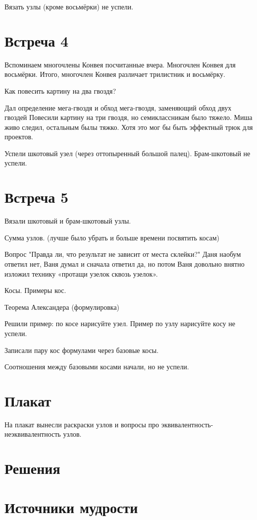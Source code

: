 \documentclass[12pt]{article}
\newcounter{problem}[section]
\theoremstyle{definition}
\begin{document}
Вязать узлы (кроме восьмёрки) не успели.

\section{Встреча 4}

Вспоминаем многочлены Конвея посчитанные вчера.
Многочлен Конвея для восьмёрки. Итого, многочлен Конвея различает
трилистник и восьмёрку.

Как повесить картину на два гвоздя?

Дал определение мега-гвоздя и обход мега-гвоздя, заменяющий обход двух гвоздей
Повесили картину на три гвоздя, но семиклассникам было тяжело. Миша живо следил,
остальным былы тяжко.
Хотя это мог бы быть эффектный трюк для проектов.

Успели шкотовый узел (через оттопыренный большой палец).
Брам-шкотовый не успели.

\section{Встреча 5}

Вязали шкотовый и брам-шкотовый узлы.

Сумма узлов. (лучше было убрать и больше времени посвятить косам)

Вопрос "Правда ли, что результат не зависит от места склейки?"
Даня наобум ответил нет, Ваня думал и сначала ответил да, но потом
Ваня довольно внятно изложил технику «протащи узелок сквозь узелок».

Косы. Примеры кос.

Теорема Александера (формулировка)

Решили пример: по косе нарисуйте узел. Пример по узлу нарисуйте косу не успели.

Записали пару кос формулами через базовые косы.

Соотношения между базовыми косами начали, но не успели.

\section{Плакат}

На плакат вынесли раскраски узлов и вопросы про эквивалентность-неэквивалентность узлов.



\renewenvironment{solution}[1]{%
         \vskip .5cm plus 2cm minus 0.1cm%
         {\bfseries \hyperlink{problem:#1}{#1.}}%
}%
{%
}%

\section{Решения}



\section{Источники мудрости}
\printbibliography[heading=none]
\end{document}
